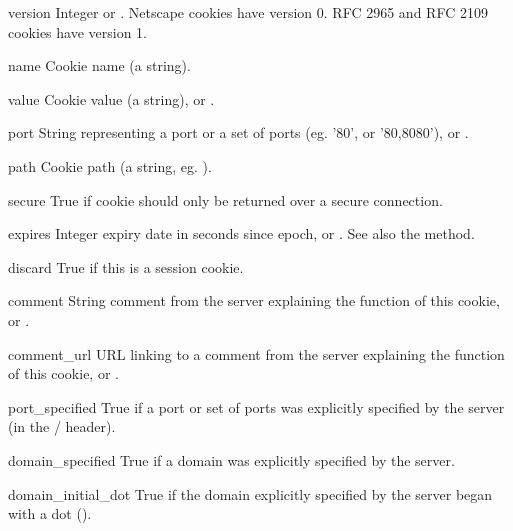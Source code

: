 \begin{memberdesc}[Cookie]{version}
Integer or .  Netscape cookies have version 0.  RFC
2965 and RFC 2109 cookies have version 1.
\end{memberdesc}
\begin{memberdesc}[Cookie]{name}
Cookie name (a string).
\end{memberdesc}
\begin{memberdesc}[Cookie]{value}
Cookie value (a string), or .
\end{memberdesc}
\begin{memberdesc}[Cookie]{port}
String representing a port or a set of ports (eg. '80', or '80,8080'),
or .
\end{memberdesc}
\begin{memberdesc}[Cookie]{path}
Cookie path (a string, eg. ).
\end{memberdesc}
\begin{memberdesc}[Cookie]{secure}
True if cookie should only be returned over a secure connection.
\end{memberdesc}
\begin{memberdesc}[Cookie]{expires}
Integer expiry date in seconds since epoch, or .  See
also the  method.
\end{memberdesc}
\begin{memberdesc}[Cookie]{discard}
True if this is a session cookie.
\end{memberdesc}
\begin{memberdesc}[Cookie]{comment}
String comment from the server explaining the function of this cookie,
or .
\end{memberdesc}
\begin{memberdesc}[Cookie]{comment_url}
URL linking to a comment from the server explaining the function of
this cookie, or .
\end{memberdesc}

\begin{memberdesc}[Cookie]{port_specified}
True if a port or set of ports was explicitly specified by the server
(in the  /  header).
\end{memberdesc}
\begin{memberdesc}[Cookie]{domain_specified}
True if a domain was explicitly specified by the server.
\end{memberdesc}
\begin{memberdesc}[Cookie]{domain_initial_dot}
True if the domain explicitly specified by the server began with a
dot ().
\end{memberdesc}

